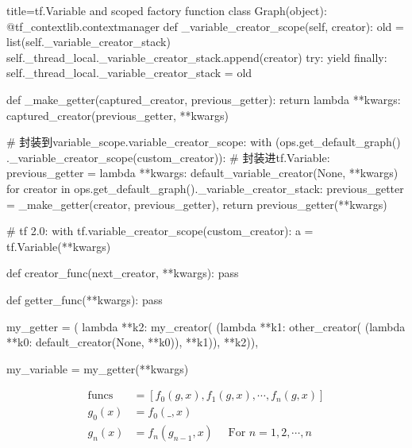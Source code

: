 \begin{frame}[fragile]
    \begin{tcblisting}{title=tf.Variable and scoped factory function}
        class Graph(object):
          @tf_contextlib.contextmanager
          def _variable_creator_scope(self, creator):
            old = list(self._variable_creator_stack)
            self._thread_local._variable_creator_stack.append(creator)
            try:
              yield
            finally:
              self._thread_local._variable_creator_stack = old

        def _make_getter(captured_creator, previous_getter):
          return lambda **kwargs: captured_creator(previous_getter, **kwargs)

        # 封装到variable_scope.variable_creator_scope:
        with (ops.get_default_graph()
                 ._variable_creator_scope(custom_creator)):
          # 封装进tf.Variable:
          previous_getter = lambda **kwargs: default_variable_creator(None, **kwargs)
          for creator in ops.get_default_graph()._variable_creator_stack:
            previous_getter = _make_getter(creator, previous_getter),
          return previous_getter(**kwargs)

        # tf 2.0:
        with tf.variable_creator_scope(custom_creator):
          a = tf.Variable(**kwargs)
    \end{tcblisting}
\end{frame}

\begin{frame}[fragile]
    \begin{tcblisting}{}
        def creator_func(next_creator, **kwargs):
          pass

        def getter_func(**kwargs):
          pass

        my_getter = (
            lambda **k2:
                my_creator(
                    (lambda **k1:
                        other_creator(
                            (lambda **k0: default_creator(None, **k0)),
                    **k1)),
                **k2)),

        my_variable = my_getter(**kwargs)
    \end{tcblisting}

    \begin{align*}
        \operatorname{funcs} &= [f_0(g, x), f_1(g, x), \cdots, f_n(g, x)] \\
        g_0(x) &= f_0(\_, x)  \\
        g_n(x) &= f_n(g_{n-1}, x)  \quad \text{ For $n = 1, 2, \cdots, n$}
    \end{align*}
\end{frame}

